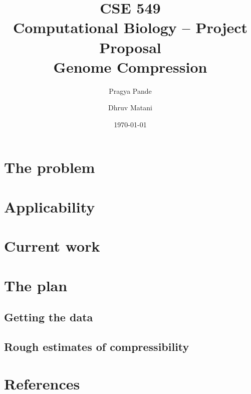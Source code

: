 \documentclass[11pt,twocolumn]{article}
\begin{document}
\title{CSE 549\\Computational Biology -- Project Proposal\\Genome Compression}
\author{Pragya Pande \and Dhruv Matani}
\date{\today}

\maketitle

\vspace{0.5in}

\section*{The problem}

\section*{Applicability}

\section*{Current work}

\subsection*{}

\section*{The plan}

\subsection*{Getting the data}

\subsection*{Rough estimates of compressibility}

\section*{References}
\end{document}
